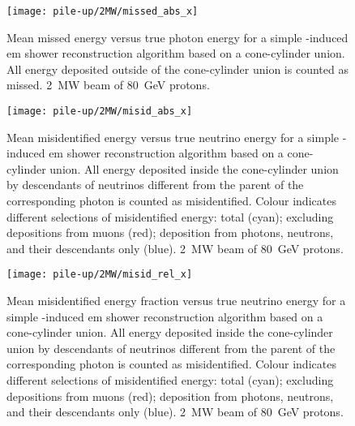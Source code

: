 \begin{figure}[htb]
	\centering
	\texttt{[image: pile-up/2MW/missed\_abs\_x]}
	\caption[Pile-up study mean missed vs.\ true photon energy, \SI{2}{\mega\watt} beam]{%
		Mean missed energy versus true photon energy for a simple \Pgpz-induced \acrshort{em} shower reconstruction algorithm based on a cone-cylinder union.
		All energy deposited outside of the cone-cylinder union is counted as missed.
		\SI{2}{\mega\watt} beam of \SI{80}{\giga\electronvolt} protons.
	}
	\label{fig:dune-nd_2MW_missed-abs-x}
\end{figure}

\begin{figure}[htb]
	\centering
	\texttt{[image: pile-up/2MW/misid\_abs\_x]}
	\caption[Pile-up study mean misidentified vs.\ true neutrino energy, \SI{2}{\mega\watt} beam]{%
		Mean misidentified energy versus true neutrino energy for a simple \Pgpz-induced \acrshort{em} shower reconstruction algorithm based on a cone-cylinder union.
		All energy deposited inside the cone-cylinder union by descendants of neutrinos different from the parent of the corresponding \Pgpz photon is counted as misidentified.
		Colour indicates different selections of misidentified energy: total (cyan); excluding depositions from muons (red); deposition from photons, neutrons, and their descendants only (blue).
		\SI{2}{\mega\watt} beam of \SI{80}{\giga\electronvolt} protons.
	}
	\label{fig:dune-nd_2MW_misid-abs-x}
\end{figure}

\begin{figure}[htb]
	\centering
	\texttt{[image: pile-up/2MW/misid\_rel\_x]}
	\caption[Pile-up study mean misidentified fractional vs.\ true neutrino energy, \SI{2}{\mega\watt} beam]{%
		Mean misidentified energy fraction versus true neutrino energy for a simple \Pgpz-induced \acrshort{em} shower reconstruction algorithm based on a cone-cylinder union.
		All energy deposited inside the cone-cylinder union by descendants of neutrinos different from the parent of the corresponding \Pgpz photon is counted as misidentified.
		Colour indicates different selections of misidentified energy: total (cyan); excluding depositions from muons (red); deposition from photons, neutrons, and their descendants only (blue).
		\SI{2}{\mega\watt} beam of \SI{80}{\giga\electronvolt} protons.
	}
	\label{fig:dune-nd_2MW_misid-rel-x}
\end{figure}

